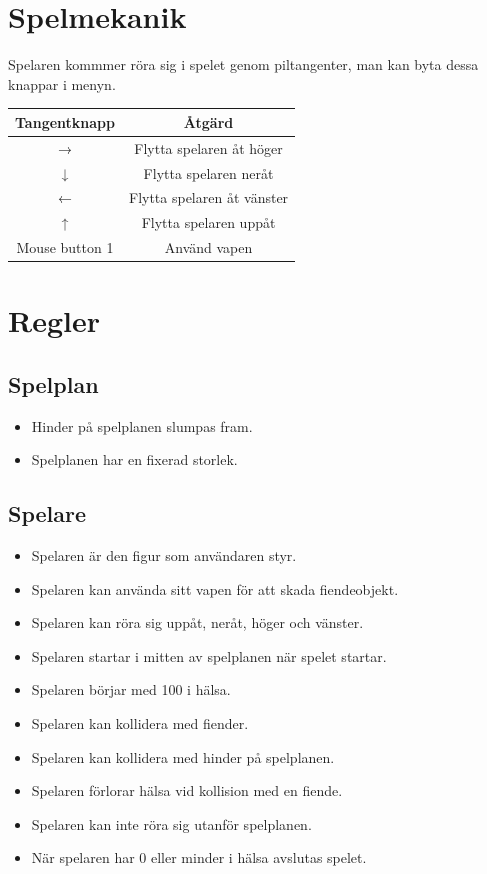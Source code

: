 \documentclass{TDP005mall}
\begin{document}
\section{Spelmekanik}
Spelaren kommmer röra sig i spelet genom piltangenter, man kan byta dessa knappar i menyn.
\begin{center}
  \begin{tabular}{ |c|c| } 
    \hline
    \textbf{Tangentknapp} & \textbf{Åtgärd} \\
    \hline
    → & Flytta spelaren åt höger \\
    \hline
    ↓ & Flytta spelaren neråt \\
    \hline
    ← & Flytta spelaren åt vänster \\
    \hline
    ↑ & Flytta spelaren uppåt \\
    \hline
    Mouse button 1 & Använd vapen \\
    \hline
  \end{tabular}
\end{center}

\section{Regler}
\subsection{Spelplan}
\begin{itemize}
\item Hinder på spelplanen slumpas fram.
\item Spelplanen har en fixerad storlek.
\end{itemize}

\subsection{Spelare}
\begin{itemize}
\item Spelaren är den figur som användaren styr.
\item Spelaren kan använda sitt vapen för att skada fiendeobjekt.
\item Spelaren kan röra sig uppåt, neråt, höger och vänster.
\item Spelaren startar i mitten av spelplanen när spelet startar.
\item Spelaren börjar med 100 i hälsa.
\item Spelaren kan kollidera med fiender.
\item Spelaren kan kollidera med hinder på spelplanen.
\item Spelaren förlorar hälsa vid kollision med en fiende.
\item Spelaren kan inte röra sig utanför spelplanen.
\item När spelaren har 0 eller minder i hälsa avslutas spelet.
\end{itemize}
\end{document}
